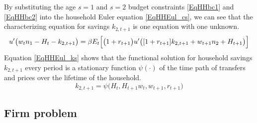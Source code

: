 \documentclass[letterpaper,12pt]{article}
\theoremstyle{definition}
\begin{document}
\begin{spacing}{1.5}
    By substituting the age $s=1$ and $s=2$ budget constraints \eqref{EqHHbc1} and \eqref{EqHHbc2} into the household Euler equation \eqref{EqHHEul_cs}, we can see that the characterizing equation for savings $k_{2,t+1}$ is one equation with one unknown.
    \begin{equation}\label{EqHHEul_ks}
      u'\bigl(w_t n_1 - H_t- k_{2,t+1}\bigr) = \beta E_t\Bigl[\bigl(1+r_{t+1}\bigr)u'\bigl([1 + r_{t+1}]k_{2,t+1} + w_{t+1}n_2 + H_{t+1}\bigr)\Bigr]
    \end{equation}
    Equation \eqref{EqHHEul_ks} shows that the functional solution for household savings $k_{2,t+1}$ every period is a stationary function $\psi(\cdot)$ of the time path of transfers and prices over the lifetime of the household.
    \begin{equation}\label{EqHH_psi}
      k_{2,t+1} = \psi\bigl(H_t, H_{t+1} w_t, w_{t+1}, r_{t+1}\bigr)
    \end{equation}


  \subsection{Firm problem}\label{SecModelFirm}


\end{spacing}
\end{document}
